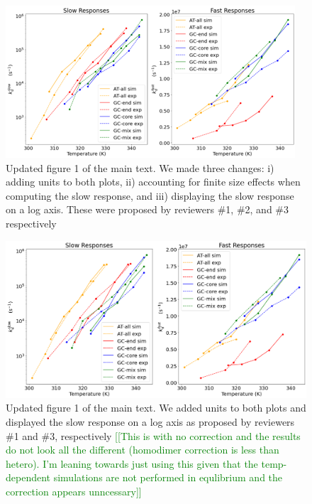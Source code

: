 \documentclass[11pt,a4paper]{letter} %
\newcommand*{\noteg}[1]{\textcolor{green}{[[#1]]}}		%
\begin{document}
\begin{figure}[ht!]
	\begin{center}
        \includegraphics[width=\textwidth]{cover_letter/revision_figures/both_response_log_4K_shift.png}
        \caption{Updated figure 1 of the main text. We made three changes: i) adding units to both plots, ii) accounting for finite size effects when computing the slow response, and iii) displaying the slow response on a log axis. These were proposed by reviewers \#1, \#2, and \#3 respectively}
        \label{fig:conc_correction}
	\end{center}
\end{figure}

\begin{figure}[ht!]
	\begin{center}
        \includegraphics[width=\textwidth]{cover_letter/revision_figures/both_response_log_no_correction_4K_shift.png}
        \caption{Updated figure 1 of the main text. We added units to both plots and displayed the slow response on a log axis as proposed by reviewers \#1 and \#3, respectively \noteg{This is with no correction and the results do not look all the different (homodimer correction is less than hetero). I'm leaning towards just using this given that the temp-dependent simulations are not performed in equlibrium and the correction appears unncessary}}
        \label{fig:conc_no_correction}
	\end{center}
\end{figure}
\end{document}
